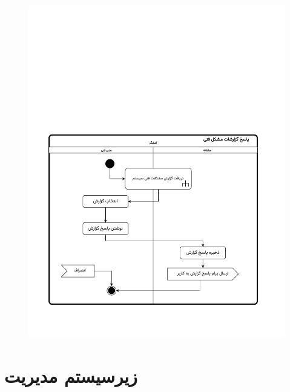 \begin{figure}[ht!]
	\centering
	\includegraphics[scale=0.8, page=1]{figs/OOD-activity-techrepans.pdf}
\end{figure}
\FloatBarrier
\newpage



\section{زیرسیستم مدیریت}


